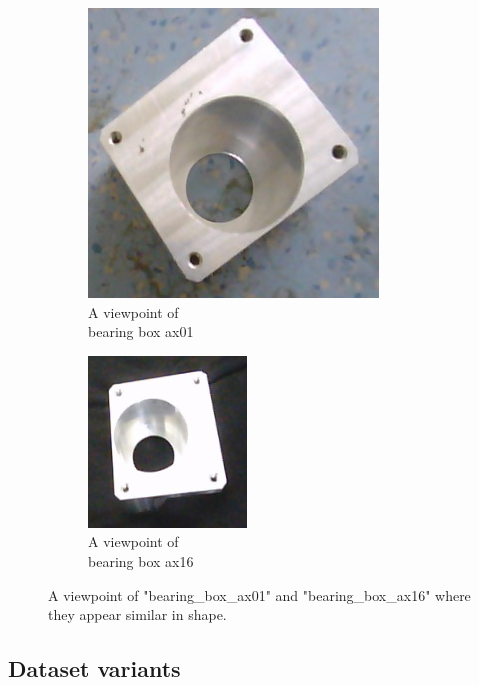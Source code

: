 \begin{itemize}
\begin{figure}[h]
	\centering
	\begin{subfigure}{.3\textwidth}
  		\centering
  		\includegraphics[width=.5\linewidth]{images/ax01_similar}
  		\caption{A viewpoint of \\bearing box ax01}
  		\label{Fig:sim2a}
	\end{subfigure}%
	\begin{subfigure}{.3\textwidth}
  		\centering
  		\includegraphics[width=.5\linewidth]{images/ax16_similar}
  		\caption{A viewpoint of \\bearing box ax16}
  		\label{Fig:sim2b}
	\end{subfigure}%
	\caption{A viewpoint of "bearing\_box\_ax01" and "bearing\_box\_ax16" where they appear similar in shape.}
	\label{Fig:sim2}
\end{figure}	
	\end{itemize}
	
	\subsection{Dataset variants}
	
